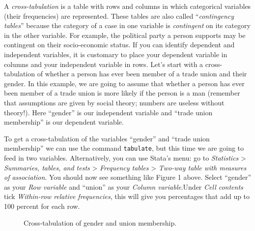 A \textit{cross-tabulation} is a table with rows and columns in which categorical variables (their frequencies) are represented. These tables are also called ``\textit{contingency tables}'' because the category of a case in one variable is \textit{contingent} on its category in the other variable. For example, the political party a person supports may be contingent on their socio-economic status. If you can identify dependent and independent variables, it is customary to place your dependent variable in columns and your independent variable in rows. Let’s start with a cross-tabulation of whether a person has ever been member of a trade union and their gender. In this example, we are going to assume that whether a person has ever been member of a trade union is more likely if the person is a man (remember that assumptions are given by social theory; numbers are useless without theory!). Here ``gender'' is our independent variable and ``trade union membership'' is our dependent variable.

To get a cross-tabulation of the variables ``gender'' and ``trade union membership'' we can use the command \texttt{tabulate}, but this time we are going to feed in two variables. Alternatively, you can use Stata's menu: go to \textit{Statistics} > \textit{Summaries, tables, and tests} > \textit{Frequency tables} > \textit{Two-way table with measures of association}. You should now see something like Figure 1 above. Select ``gender'' as your \textit{Row variable} and ``union'' as your \textit{Column variable}.Under \textit{Cell contents} tick \textit{Within-row relative frequencies}, this will give you percentages that add up to 100 percent for each row.

\begin{figure}[H]
	\centering
	\caption{Cross-tabulation of gender and union membership.}
\end{figure}

